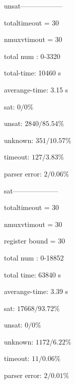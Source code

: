 unsat------------------

totaltimeout = 30

nmuxvtimout = 30

total num : 0-3320

total-time: 10460 s

averange-time: 3.15 s 

sat: $0 / 0\%$

unsat: $2840 / 85.54\%$

unknown: $351 / 10.57\%$

timeout: $127 / 3.83\%$

parser error: $2 / 0.06\%$

sat--------------------

totaltimeout = 30

nmuxvtimout = 30

register bound = 30

total num : 0-18852

total time: 63840 s

averange-time: 3.39 s 

sat: $17668 / 93.72\%$

unsat: $0 / 0\%$


unknown: $1172 / 6.22\%$

timeout: $11 / 0.06\%$

parser error: $2 / 0.01\%$